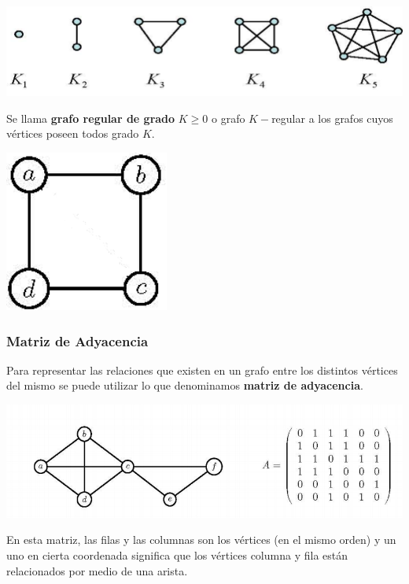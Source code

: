 \documentclass[10pt,a4paper,openright]{book}
\begin{document}
\begin{center}
\includegraphics[scale=0.65]{grafo completo}
\end{center}

Se llama \textbf{grafo regular de grado }$K\geq 0$ o grafo $K-$regular a los grafos cuyos vértices poseen todos grado $K$.

\begin{center}
\includegraphics[scale=0.65]{grafo regular}
\end{center}


\subsubsection*{Matriz de Adyacencia}
Para representar las relaciones que existen en un grafo entre los distintos vértices del mismo se puede utilizar lo que denominamos \textbf{matriz de adyacencia}.

\begin{center}
\includegraphics[scale=0.65]{matriz de adyacencia}
\end{center}

En esta matriz, las filas y las columnas son los vértices (en el mismo orden) y un uno en cierta coordenada significa que los vértices columna y fila están relacionados por medio de una arista.
\end{document}
